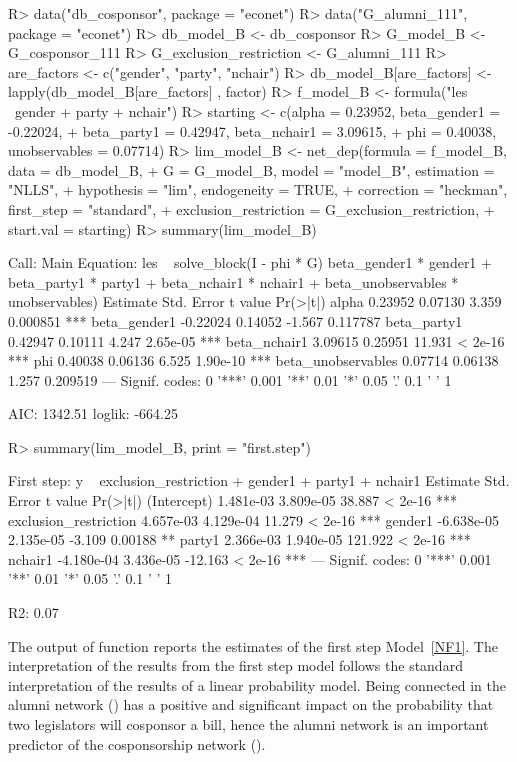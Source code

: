 \documentclass[nojss]{jss}
\begin{document}
\begin{CodeChunk}
\begin{CodeInput}
R> data("db_cosponsor", package = "econet")
R> data("G_alumni_111", package = "econet")
R> db_model_B <- db_cosponsor
R> G_model_B <- G_cosponsor_111
R> G_exclusion_restriction <- G_alumni_111
R> are_factors <- c("gender", "party", "nchair")
R> db_model_B[are_factors] <- lapply(db_model_B[are_factors] , factor)
R> f_model_B <- formula("les ~gender + party + nchair")
R> starting <- c(alpha = 0.23952, beta_gender1 = -0.22024,
+    beta_party1 = 0.42947, beta_nchair1 = 3.09615,
+    phi = 0.40038, unobservables = 0.07714)
R> lim_model_B <- net_dep(formula = f_model_B, data = db_model_B,
+    G = G_model_B, model = "model_B", estimation = "NLLS",
+    hypothesis = "lim", endogeneity = TRUE, 
+    correction = "heckman", first_step = "standard", 
+    exclusion_restriction = G_exclusion_restriction, 
+    start.val = starting)
R> summary(lim_model_B)
\end{CodeInput}
\begin{CodeOutput}
Call:
Main Equation: les ~ solve_block(I - phi * G) %
beta_gender1 * gender1 + beta_party1 * party1 + 
beta_nchair1 * nchair1 + beta_unobservables * unobservables)
                   Estimate Std. Error t value Pr(>|t|)    
alpha               0.23952    0.07130   3.359 0.000851 ***
beta_gender1       -0.22024    0.14052  -1.567 0.117787    
beta_party1         0.42947    0.10111   4.247 2.65e-05 ***
beta_nchair1        3.09615    0.25951  11.931  < 2e-16 ***
phi                 0.40038    0.06136   6.525 1.90e-10 ***
beta_unobservables  0.07714    0.06138   1.257 0.209519    
---
Signif. codes:  0 '***' 0.001 '**' 0.01 '*' 0.05 '.' 0.1 ' ' 1

AIC: 1342.51  loglik: -664.25
\end{CodeOutput}
\begin{CodeInput}
R> summary(lim_model_B, print = "first.step")
\end{CodeInput}
\begin{CodeOutput}
First step:  y ~ exclusion_restriction + gender1 + party1 + nchair1
                        Estimate Std. Error t value Pr(>|t|)    
(Intercept)            1.481e-03  3.809e-05  38.887  < 2e-16 ***
exclusion_restriction  4.657e-03  4.129e-04  11.279  < 2e-16 ***
gender1               -6.638e-05  2.135e-05  -3.109  0.00188 ** 
party1                 2.366e-03  1.940e-05 121.922  < 2e-16 ***
nchair1               -4.180e-04  3.436e-05 -12.163  < 2e-16 ***
---
Signif. codes:  0 '***' 0.001 '**' 0.01 '*' 0.05 '.' 0.1 ' ' 1

R2: 0.07
\end{CodeOutput}
\end{CodeChunk}
%
The output of function 
reports the estimates of the first step Model~\ref{NF1}.  The
interpretation of the results from the first step model follows the standard
interpretation of the results of a linear probability model.  Being
connected in the alumni network () has a
positive and significant impact on the probability that two legislators will
cosponsor a bill, hence the alumni network is an important predictor of the
cosponsorship network ().
\end{document}
